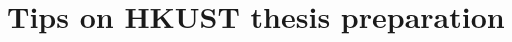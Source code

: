 \documentclass[a4paper]{ustthesis}
\begin{document}


\newpage

\appendix
\chapter{Tips on HKUST thesis preparation}
\label{chp_tips}


\end{document}
